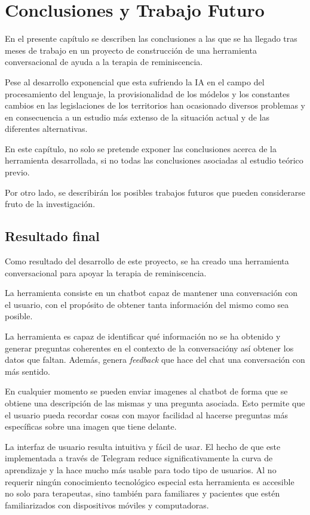 \chapter{Conclusiones y Trabajo Futuro}
\label{cap:conclusiones}
En el presente capítulo se describen las conclusiones a las que se ha llegado tras meses de trabajo en un proyecto de construcción de una herramienta conversacional de ayuda a la terapia de reminiscencia.

Pese al desarrollo exponencial que esta sufriendo la IA en el campo del procesamiento del lenguaje, la provisionalidad de los módelos y los constantes cambios en las legislaciones de los territorios han ocasionado diversos problemas y en consecuencia a un estudio más extenso de la situación actual y de las diferentes alternativas. 

En este capítulo, no solo se pretende exponer las conclusiones acerca de la herramienta desarrollada, si no todas las conclusiones asociadas al estudio teórico previo. 

Por otro lado, se describirán los posibles trabajos futuros que pueden considerarse fruto de la investigación.


\section{Resultado final}
Como resultado del desarrollo de este proyecto, se ha creado una herramienta conversacional para apoyar la terapia de reminiscencia. 

La herramienta consiste en un chatbot capaz de mantener una conversación con el usuario, con el propósito de obtener tanta información del mismo como sea posible. 

La  herramienta es capaz de identificar qué información no se ha obtenido y generar preguntas coherentes en el contexto de la conversacióny así obtener los datos que faltan. Además, genera \textit{feedback} que hace del chat una conversación con más sentido. 

En cualquier momento se pueden enviar imagenes al chatbot de forma que se obtiene una descripción de las mismas y una pregunta asociada. Esto permite que el usuario pueda recordar cosas con mayor facilidad al hacerse preguntas más específicas sobre una imagen que tiene delante. 

La interfaz de usuario resulta intuitiva y fácil de usar. El hecho de que este implementada a través de Telegram reduce significativamente la curva de aprendizaje y la hace mucho más usable para todo tipo de usuarios. Al no requerir ningún conocimiento tecnológico especial esta herramienta es accesible no solo para terapeutas, sino también para familiares y pacientes que estén familiarizados con dispositivos móviles y computadoras.

